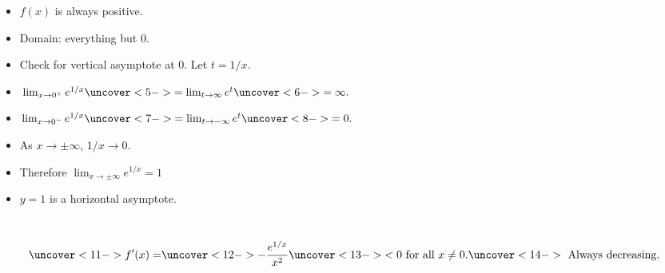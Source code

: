 \begin{frame}
\begin{example}[Example 7, p. 400]
\begin{columns}[c]
{}%
%
\begin{itemize}
\item<2->  $f(x)$ is always positive.
\item<3->  Domain: everything but 0.
\item<4->  Check for vertical asymptote at 0.  Let $t = 1/x$.
\item<4->  $\lim_{x\rightarrow 0^+} e^{1/x} \uncover<5->{ = \lim_{t\rightarrow\infty}e^t} \uncover<6->{ = \infty .}$
\item<4->  $\lim_{x\rightarrow 0^-} e^{1/x} \uncover<7->{ = \lim_{t\rightarrow -\infty}e^t} \uncover<8->{ = 0.}$
\item<9->  As $x\rightarrow \pm \infty$, $1/x \rightarrow 0$.
\item<10->  Therefore $\lim_{x\rightarrow \pm \infty} e^{1/x} = 1$
\item<10->  $y = 1$ is a horizontal asymptote.
\end{itemize}
\end{columns}
\[
\uncover<11->{f'(x) =} \uncover<12->{-\frac{e^{1/x}}{x^2}} \uncover<13->{< 0 \textrm{ for all $x\neq 0$.}} \uncover<14->{\textrm{ Always decreasing.}}
\]
\end{example}
\end{frame}
